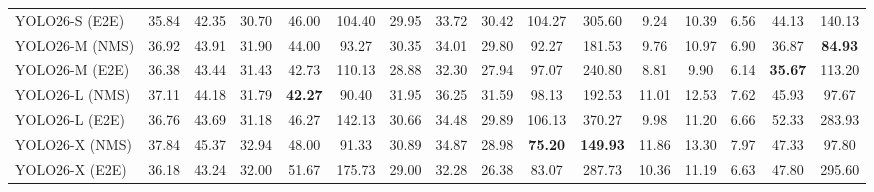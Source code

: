 \begin{table}[!thb]
\begin{tabular}{l *{15}{c}}
YOLO26-S (E2E) & 35.84 & 42.35 & 30.70 & 46.00 & 104.40 & 29.95 & 33.72 & 30.42 & 104.27 & 305.60 &  9.24 & 10.39 &  6.56 &  44.13 & 140.13 \\
YOLO26-M (NMS) & 36.92 & 43.91 & 31.90 & 44.00 &  93.27 & 30.35 & 34.01 & 29.80 &  92.27 & 181.53 &  9.76 & 10.97 &  6.90 &  36.87 & \textbf{84.93} \\
YOLO26-M (E2E) & 36.38 & 43.44 & 31.43 & 42.73 & 110.13 & 28.88 & 32.30 & 27.94 &  97.07 & 240.80 &  8.81 &  9.90 &  6.14 & \textbf{35.67} & 113.20 \\
YOLO26-L (NMS) & 37.11 & 44.18 & 31.79 & \textbf{42.27} &  90.40 & 31.95 & 36.25 & 31.59 &  98.13 & 192.53 & 11.01 & 12.53 &  7.62 &  45.93 &  97.67 \\
YOLO26-L (E2E) & 36.76 & 43.69 & 31.18 & 46.27 & 142.13 & 30.66 & 34.48 & 29.89 & 106.13 & 370.27 &  9.98 & 11.20 &  6.66 &  52.33 & 283.93 \\
YOLO26-X (NMS) & 37.84 & 45.37 & 32.94 & 48.00 &  91.33 & 30.89 & 34.87 & 28.98 & \textbf{75.20} & \textbf{149.93} & 11.86 & 13.30 &  7.97 &  47.33 &  97.80 \\
YOLO26-X (E2E) & 36.18 & 43.24 & 32.00 & 51.67 & 175.73 & 29.00 & 32.28 & 26.38 &  83.07 & 287.73 & 10.36 & 11.19 &  6.63 &  47.80 & 295.60 \\
\bottomrule
\end{tabular}
\end{table}